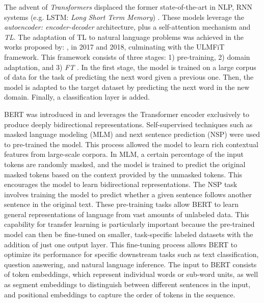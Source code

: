 \documentclass[onecolumn, journal, english, 12pt, a4paper]{IEEEtran} %
\theoremstyle{definition}
\begin{document}
The advent of \emph{Transformers} displaced the former
state-of-the-art in NLP, RNN systems (e.g. LSTM: \emph{Long Short Term
  Memory}) \cite{tunstall2022natural}. These models leverage the
\emph{autoencoder: encoder-decoder} architecture, plus a
self-attention mechanism and \emph{TL}. The adaptation of TL to
natural language problems was achieved in the works proposed by:
\cite{radford2019language}, \cite{Peters2018} in 2017 and 2018,
culminating with the ULMFiT framework\cite{howard2018}. This framework
consists of three stages: 1) pre-training, 2) domain adaptation, and
3) \emph{FT} \cite{tunstall2022natural}. In the first stage, the model
is trained on a large corpus of data for the task of predicting the
next word given a previous one. Then, the model is adapted to the
target dataset by predicting the next word in the new domain. Finally,
a classification layer is added\cite{tunstall2022natural}.

BERT was introduced in \cite{devlin2018bert} and leverages the
Transformer encoder exclusively to produce deeply bidirectional
representations. Self-supervised techniques such as masked language
modeling (MLM) and next sentence prediction (NSP) were used to
pre-trained the model. This process allowed the model to learn rich
contextual features from large-scale corpora. In MLM, a certain
percentage of the input tokens are randomly masked, and the model is
trained to predict the original masked tokens based on the context
provided by the unmasked tokens. This encourages the model to learn
bidirectional representations. The NSP task involves training the
model to predict whether a given sentence follows another sentence in
the original text. These pre-training tasks allow BERT to learn
general representations of language from vast amounts of unlabeled
data. This capability for transfer learning is particularly important
because the pre-trained model can then be fine-tuned on smaller,
task-specific labeled datasets with the addition of just one output
layer. This fine-tuning process allows BERT to optimize its
performance for specific downstream tasks such as text classification,
question answering, and natural language inference. The input to BERT
consists of token embeddings, which represent individual words or
sub-word units, as well as segment embeddings to distinguish between
different sentences in the input, and positional embeddings to capture
the order of tokens in the sequence.
\end{document}
